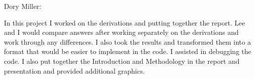 \documentclass[../main.tex]{subfiles}
\begin{document}
Dory Miller:

In this project I worked on the derivations and putting together the report.  Lee and I would compare answers after working separately on the derivations and work through any differences.  I also took the results and transformed them into a format that would be easier to implement in the code.   I assisted in debugging the code. I also put together the Introduction and Methodology in the report and presentation and provided additional graphics.
\end{document}

